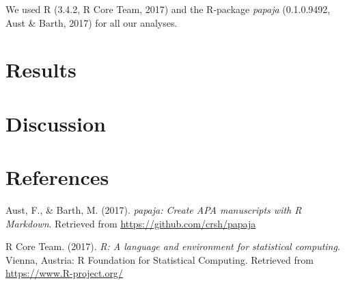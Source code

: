 \documentclass[english,jou]{apa6}
\theoremstyle{definition}
\theoremstyle{definition}
\theoremstyle{definition}
\theoremstyle{remark}
\begin{document}
We used R (3.4.2, R Core Team, 2017) and the R-package \emph{papaja}
(0.1.0.9492, Aust \& Barth, 2017) for all our analyses.

\section{Results}\label{results}

\section{Discussion}\label{discussion}

\newpage

\section{References}\label{references}

\setlength{\parindent}{-0.5in} \setlength{\leftskip}{0.5in}

\hypertarget{refs}{}
\hypertarget{ref-R-papaja}{}
Aust, F., \& Barth, M. (2017). \emph{papaja: Create APA manuscripts with
R Markdown}. Retrieved from \url{https://github.com/crsh/papaja}

\hypertarget{ref-R-base}{}
R Core Team. (2017). \emph{R: A language and environment for statistical
computing}. Vienna, Austria: R Foundation for Statistical Computing.
Retrieved from \url{https://www.R-project.org/}
\end{document}
